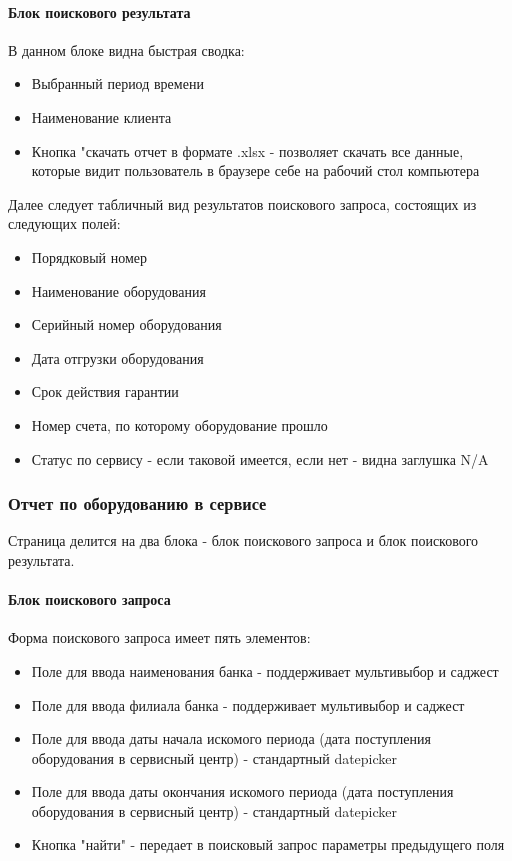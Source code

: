 \documentclass[DIV=calc, paper=a4, fontsize=11pt]{scrartcl} %
\begin{document}
\paragraph{Блок поискового результата}
В данном блоке видна быстрая сводка:

\begin{itemize}
	\item Выбранный период времени
	\item Наименование клиента
	\item Кнопка "скачать отчет в формате .xlsx - позволяет скачать все данные, которые видит пользователь в браузере себе на рабочий стол компьютера
\end{itemize}

Далее следует табличный вид результатов поискового запроса, состоящих из следующих полей:

\begin{itemize}
	\item Порядковый номер
	\item Наименование оборудования
	\item Серийный номер оборудования
	\item Дата отгрузки оборудования
	\item Срок действия гарантии
	\item Номер счета, по которому оборудование прошло
	\item Статус по сервису - если таковой имеется, если нет - видна заглушка N/A
\end{itemize}

\subsubsection{Отчет по оборудованию в сервисе}

Страница делится на два блока - блок поискового запроса и блок поискового результата.
\paragraph{Блок поискового запроса}
Форма поискового запроса имеет пять элементов:

\begin{itemize}
	\item Поле для ввода наименования банка - поддерживает мультивыбор и саджест
	\item Поле для ввода филиала банка - поддерживает мультивыбор и саджест
	\item Поле для ввода даты начала искомого периода (дата поступления оборудования в сервисный центр) - стандартный datepicker
	\item Поле для ввода даты окончания искомого периода (дата поступления оборудования в сервисный центр) - стандартный datepicker
	\item Кнопка "найти" - передает в поисковый запрос параметры предыдущего поля
\end{itemize}
\end{document}
